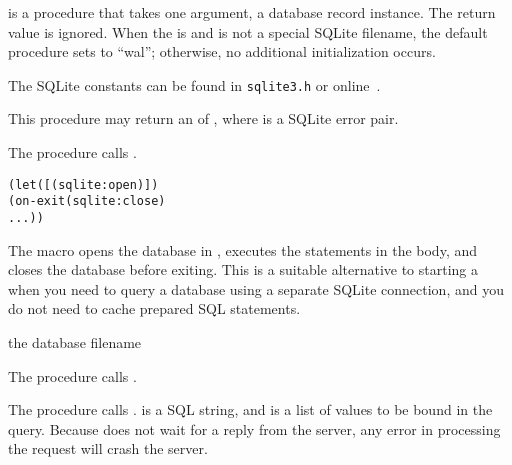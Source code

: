 is a procedure that takes one argument, a database
record instance. The return value is ignored. When the  is
 and  is not a special SQLite filename, the
default procedure sets  to ``wal''; otherwise, no
additional initialization occurs.

The SQLite constants can be found in \texttt{sqlite3.h} or
online~\cite{sqlite}.

This procedure may return an  of , where  is a SQLite error
pair.

\begin{procedure}
\end{procedure}
\returns{}

The  procedure calls .

\begin{syntax}
\end{syntax}
\expandsto{} \antipar\begin{alltt}
(let ([ (sqlite:open  )])
  (on-exit (sqlite:close )
      ...))
\end{alltt}

The  macro opens the database in ,
executes the statements in the body, and closes the database before
exiting.  This is a suitable alternative to starting a
 when you need to query a database using a separate
SQLite connection, and you do not need to cache prepared SQL
statements.

\begin{procedure}
\end{procedure}
\returns{} the database filename

The  procedure calls .

\begin{procedure}
\end{procedure}
\returns{}

The  procedure calls .   is a SQL string, and
 is a list of values to be bound in the query.
Because  does not wait for a reply from the server, any
error in processing the request will crash the server.

